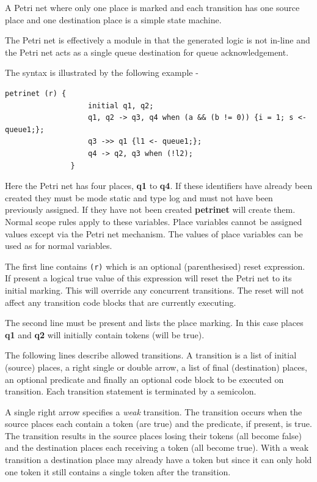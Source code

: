         A Petri net where only one place is marked and each transition
        has one source place and one destination place is a simple state
        machine.
        
        The Petri net is effectively a module in that the generated logic is
        not in-line and the Petri net acts as a single queue destination for
        queue acknowledgement.
        
        The syntax is illustrated by the following example -
        \begin{lstlisting}[gobble=8, language=threepl]
               petrinet (r) {
                   initial q1, q2;
                   q1, q2 -> q3, q4 when (a && (b != 0)) {i = 1; s <- queue1;};
                   q3 ->> q1 {l1 <- queue1;};
                   q4 -> q2, q3 when (!l2);
               }
        \end{lstlisting}
        Here the Petri net has four places, {\bf q1} to {\bf q4}. If these
        identifiers have already been created they must be mode static
        and type log and must not have been previously assigned. If they
        have not been created {\bf petrinet} will create them. Normal scope
        rules apply to these variables. Place variables cannot be assigned
        values except via the Petri net mechanism. The values of place
        variables can be used as for normal variables.
        
        The first line contains \verb'(r)' which is an optional (parenthesised)
        reset expression. If present a logical true value of this expression
        will reset the Petri net to its initial marking. This will override any
        concurrent transitions. The reset will not affect any transition code
        blocks that are currently executing.
        
        The second line must be present and lists the place marking. In this
        case places {\bf q1} and {\bf q2} will initially contain tokens (will
        be true).
        
        The following lines describe allowed transitions. A transition
        is a list of initial (source) places, a right single or double arrow,
        a list of final (destination) places, an optional predicate and
        finally an optional code block to be executed on transition. Each
        transition statement is terminated by a semicolon.
        
        A single right arrow specifies a {\em weak} transition. The transition
        occurs when the source places each contain a token (are true) and the
        predicate, if present, is true. The transition results in the source
        places losing their tokens (all become false) and the destination places
        each receiving a token (all become true). With a weak transition a
        destination place may already have a token but since it can only hold
        one token it still contains a single token after the transition.
              

